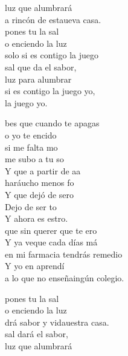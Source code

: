 \begin{cancion}
\begin{chorus}
		luz que alumbrará\\
		a rincón de estaueva casa.\\
		 pones tu la sal \\
		o enciendo la luz\\
		 solo si es contigo  la juego\\
		 sal que da el sabor, \\
		luz para alumbrar\\
		 si es contigo  la juego yo, \\
		 la juego yo.\jump\\
	\end{chorus}%
	bes que cuando te apagas \\
	o yo te encido\\
	 si me falta mo \\
	me subo a tu so\\
	Y  que a partir de aa \\
	haráucho menos fo\\
	Y  que dejó de sero\\
	Dejo de ser to\\
	Y ahora es estro.\\
	\jump
	 que sin querer que te ero\\
	Y ya veque cada días má\\
	 en mi farmacia tendrás remedio\\
	Y yo en  aprendí \\
	a lo que no enseñaingún colegio.\jump\\
	\begin{chorus}%
		 pones tu la sal \\
		o enciendo la luz\\
		drá sabor y vidauestra casa.\\
		 sal dará el sabor, \\
		luz que alumbrará\\

\end{chorus}
\end{cancion}
